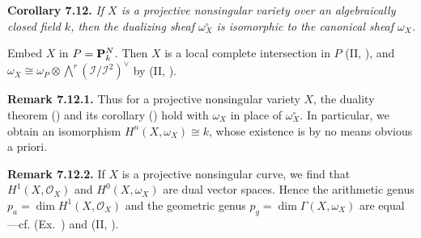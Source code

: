 {\medskip
\noindent\hypertarget{result-III-7.12}{}\textbf{Corollary 7.12.} \emph{If $X$ is a projective nonsingular variety over an algebraically closed field $k$, then the dualizing sheaf $\omega_X^\circ$ is isomorphic to the canonical sheaf $\omega_X$.}

\Proof Embed $X$ in $P=\mathbf{P}_k^N$. Then $X$ is a local complete intersection in $P$ (II, ), and $\omega_X\cong\omega_P\otimes\bigwedge^r(\mathcal I/\mathcal I^2)^\vee$ by (II, ).

\medskip
\noindent\hypertarget{result-III-7.12.1}{}\textbf{Remark 7.12.1.} Thus for a projective nonsingular variety $X$, the duality theorem () and its corollary () hold with $\omega_X$ in place of $\omega_X^\circ$. In particular, we obtain an isomorphism $H^n(X,\omega_X)\cong k$, whose existence is by no means obvious a priori.

\medskip
\noindent\hypertarget{result-III-7.12.2}{}\textbf{Remark 7.12.2.} If $X$ is a projective nonsingular curve, we find that $H^1(X,\mathcal O_X)$ and $H^0(X,\omega_X)$ are dual vector spaces. Hence the arithmetic genus $p_a=\dim H^1(X,\mathcal O_X)$ and the geometric genus $p_g=\dim\Gamma(X,\omega_X)$ are equal---cf. (Ex.~) and (II, ).
}
